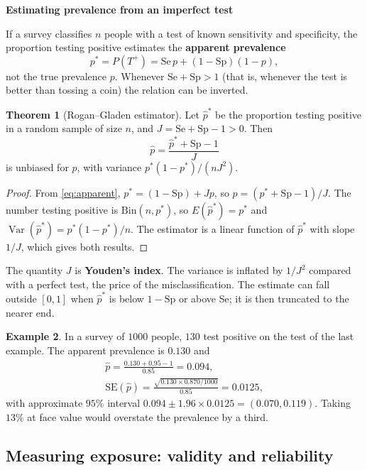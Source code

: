 \documentclass[11pt,a4paper]{article}
\numberwithin{equation}{section}
\DeclareMathOperator{\Var}{Var}
\theoremstyle{definition}
\newtheorem{thm}{Theorem}[subsection]
\newtheorem{exa}[thm]{Example}
\newcommand{\subhead}[1]{%
  \par\medskip\noindent\textbf{#1}\par\nobreak\smallskip}
\begin{document}
\subhead{Estimating prevalence from an imperfect test}

If a survey classifies $n$ people with a test of known sensitivity and specificity, the proportion testing positive estimates the
\textbf{apparent prevalence}
\begin{equation}
\label{eq:apparent}
p^* = P(T^+) = \text{Se}\,p + (1 - \text{Sp})(1 - p) ,
\end{equation}
not the true prevalence $p$. Whenever $\text{Se} + \text{Sp} > 1$ (that is, whenever the test is better than tossing a coin) the relation can be inverted.

\begin{thm}[Rogan--Gladen estimator]
\label{thm:rogan}
Let $\hat p^*$ be the proportion testing positive in a random sample of size $n$, and $J = \text{Se} + \text{Sp} - 1 > 0$. Then
\[
\hat p = \frac{\hat p^* + \text{Sp} - 1}{J}
\]
is unbiased for $p$, with variance $p^*(1 - p^*)/(nJ^2)$.
\end{thm}

\begin{proof}
From \eqref{eq:apparent}, $p^* = (1 - \text{Sp}) + Jp$, so $p = (p^* + \text{Sp} - 1)/J$. The number testing positive is $\text{Bin}(n, p^*)$, so
$E(\hat p^*) = p^*$ and $\Var(\hat p^*) = p^*(1 - p^*)/n$. The estimator is a linear function of $\hat p^*$ with slope $1/J$, which gives both results.
\end{proof}

The quantity $J$ is \textbf{Youden's index}. The variance is inflated by $1/J^2$ compared with a perfect test, the price of the
misclassification. The estimate can fall outside $[0, 1]$ when $\hat p^*$ is below $1 - \text{Sp}$ or above Se; it is then truncated to the nearer
end.

\begin{exa}
In a survey of $1000$ people, $130$ test positive on the test of the last example. The apparent prevalence is $0.130$ and
\begin{gather*}
\hat p = \frac{0.130 + 0.95 - 1}{0.85} = 0.094, \\
\text{SE}(\hat p) = \frac{\sqrt{0.130 \times 0.870/1000}}{0.85} = 0.0125 ,
\end{gather*}
with approximate $95\%$ interval $0.094 \pm 1.96 \times 0.0125 = (0.070, 0.119)$. Taking $13\%$ at face value would overstate the
prevalence by a third.
\end{exa}

\subsection{Measuring exposure: validity and reliability}
\end{document}
